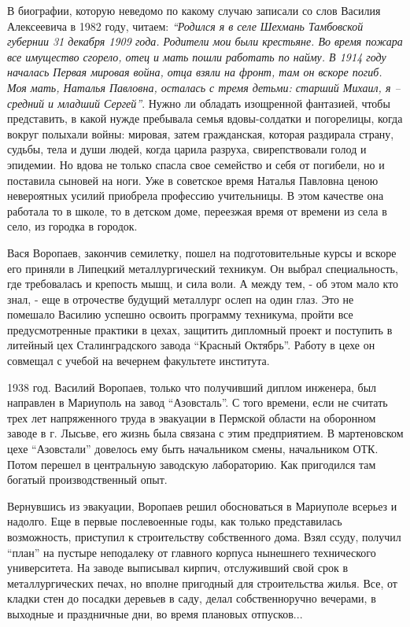 В биографии, которую неведомо по какому случаю записали со слов Василия
Алексеевича в 1982 году, читаем: \emph{\enquote{Родился я в селе Шехмань Тамбовской губернии
31 декабря 1909 года. Родители мои были крестьяне. Во время пожара все
имущество сгорело, отец и мать пошли работать по найму. В 1914 году началась
Первая мировая война, отца взяли на фронт, там он вскоре погиб. Моя мать,
Наталья Павловна, осталась с тремя детьми: старший Михаил, я – средний и
младший Сергей}}. Нужно ли обладать изощренной фантазией, чтобы представить, в
какой нужде пребывала семья вдовы-солдатки и погорелицы, когда вокруг полыхали
войны: мировая, затем гражданская, которая раздирала страну, судьбы, тела и
души людей, когда царила разруха, свирепствовали голод и эпидемии. Но вдова не
только спасла свое семейство и себя от погибели, но и поставила сыновей на
ноги. Уже в советское время Наталья Павловна ценою невероятных усилий приобрела
профессию учительницы. В этом качестве она работала то в школе, то в детском
доме, переезжая время от времени из села в село, из городка в городок. 


Вася Воропаев, закончив семилетку, пошел на подготовительные курсы и вскоре его
приняли в Липецкий металлургический техникум. Он выбрал специальность, где
требовалась и крепость мышц, и сила воли. А между тем, - об этом мало кто знал,
- еще в отрочестве будущий металлург ослеп на один глаз. Это не помешало
Василию успешно освоить программу техникума, пройти все предусмотренные
практики в цехах, защитить дипломный проект и поступить в литейный цех
Сталинградского завода \enquote{Красный Октябрь}. Работу в цехе он совмещал с учебой на
вечернем факультете института.

1938 год. Василий Воропаев, только что получивший диплом инженера, был
направлен в Мариуполь на завод \enquote{Азовсталь}. С того времени, если не считать
трех лет напряженного труда в эвакуации в Пермской области на оборонном заводе
в г. Лысьве, его жизнь была связана с этим предприятием. В мартеновском цехе
\enquote{Азовстали} довелось ему быть начальником смены, начальником ОТК. Потом перешел
в центральную заводскую лабораторию. Как пригодился там богатый
производственный опыт.

Вернувшись из эвакуации, Воропаев решил обосноваться в Мариуполе всерьез и
надолго. Еще в первые послевоенные годы, как только представилась возможность,
приступил к строительству собственного дома. Взял ссуду, получил \enquote{план} на
пустыре неподалеку от главного корпуса нынешнего технического университета. На
заводе выписывал кирпич, отслуживший свой срок в металлургических печах, но
вполне пригодный для строительства жилья. Все, от кладки стен до посадки
деревьев в саду, делал собственноручно вечерами, в выходные и праздничные дни,
во время плановых отпусков...


